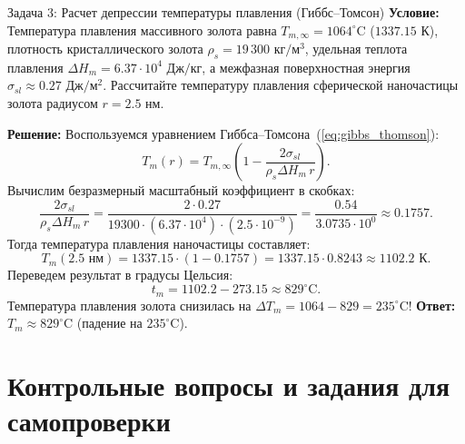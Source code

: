 \documentclass[12pt,a4paper]{article}
\begin{document}
\begin{exbox}{Задача 3: Расчет депрессии температуры плавления (Гиббс--Томсон)}
\textbf{Условие:} Температура плавления массивного золота равна $T_{m,\infty} = 1064^\circ\mathrm{C}$ ($1337.15\text{ К}$), плотность кристаллического золота $\rho_s = 19\,300\text{ кг}/\text{м}^3$, удельная теплота плавления $\Delta H_m = 6.37 \cdot 10^4\text{ Дж}/\text{кг}$, а межфазная поверхностная энергия $\sigma_{sl} \approx 0.27\text{ Дж}/\text{м}^2$.
Рассчитайте температуру плавления сферической наночастицы золота радиусом $r = 2.5\text{ нм}$.

\tcbline
\textbf{Решение:}
Воспользуемся уравнением Гиббса--Томсона~(\ref{eq:gibbs_thomson}):
\begin{equation*}
T_m(r) = T_{m,\infty} \left( 1 - \frac{2\sigma_{sl}}{\rho_s \Delta H_m \, r} \right).
\end{equation*}
Вычислим безразмерный масштабный коэффициент в скобках:
\begin{equation*}
\frac{2\sigma_{sl}}{\rho_s \Delta H_m \, r} = \frac{2 \cdot 0.27}{19300 \cdot (6.37 \cdot 10^4) \cdot (2.5 \cdot 10^{-9})} = \frac{0.54}{3.0735 \cdot 10^0} \approx 0.1757.
\end{equation*}
Тогда температура плавления наночастицы составляет:
\begin{equation*}
T_m(2.5\text{ нм}) = 1337.15 \cdot (1 - 0.1757) = 1337.15 \cdot 0.8243 \approx 1102.2\text{ К}.
\end{equation*}
Переведем результат в градусы Цельсия:
\begin{equation*}
t_m = 1102.2 - 273.15 \approx 829^\circ\mathrm{C}.
\end{equation*}
Температура плавления золота снизилась на $\Delta T_m = 1064 - 829 = 235^\circ\mathrm{C}$!
\textbf{Ответ:} $T_m \approx 829^\circ\mathrm{C}$ (падение на $235^\circ\mathrm{C}$).
\end{exbox}

\section{Контрольные вопросы и задания для самопроверки}
\label{sec:questions}
\end{document}
